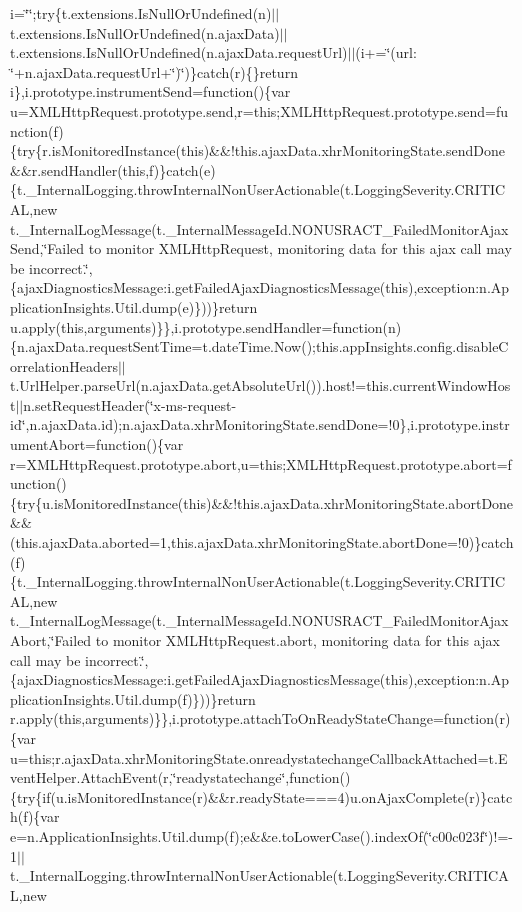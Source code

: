 i=\char`\"{}\char`\"{};try\{t.\+extensions.\+Is\+Null\+Or\+Undefined(n)$\vert$$\vert$t.\+extensions.\+Is\+Null\+Or\+Undefined(n.\+ajax\+Data)$\vert$$\vert$t.\+extensions.\+Is\+Null\+Or\+Undefined(n.\+ajax\+Data.\+request\+Url)$\vert$$\vert$(i+=\char`\"{}(url\+: \textquotesingle{}\char`\"{}+n.\+ajax\+Data.\+request\+Url+\char`\"{}\textquotesingle{})\char`\"{})\}catch(r)\{\}return i\},i.\+prototype.\+instrument\+Send=function()\{var u=\+X\+M\+L\+Http\+Request.\+prototype.\+send,r=this;\+X\+M\+L\+Http\+Request.\+prototype.\+send=function(f)\{try\{r.\+is\+Monitored\+Instance(this)\&\&!this.\+ajax\+Data.\+xhr\+Monitoring\+State.\+send\+Done\&\&r.\+send\+Handler(this,f)\}catch(e)\{t.\+\_\+\+Internal\+Logging.\+throw\+Internal\+Non\+User\+Actionable(t.\+Logging\+Severity.\+C\+R\+I\+T\+I\+C\+A\+L,new t.\+\_\+\+Internal\+Log\+Message(t.\+\_\+\+Internal\+Message\+Id.\+N\+O\+N\+U\+S\+R\+A\+C\+T\+\_\+\+Failed\+Monitor\+Ajax\+Send,\char`\"{}\+Failed to monitor X\+M\+L\+Http\+Request, monitoring data for this ajax call may be incorrect.\char`\"{},\{ajax\+Diagnostics\+Message\+:i.\+get\+Failed\+Ajax\+Diagnostics\+Message(this),exception\+:n.\+Application\+Insights.\+Util.\+dump(e)\}))\}return u.\+apply(this,arguments)\}\},i.\+prototype.\+send\+Handler=function(n)\{n.\+ajax\+Data.\+request\+Sent\+Time=t.\+date\+Time.\+Now();this.\+app\+Insights.\+config.\+disable\+Correlation\+Headers$\vert$$\vert$t.\+Url\+Helper.\+parse\+Url(n.\+ajax\+Data.\+get\+Absolute\+Url()).\+host!=this.\+current\+Window\+Host$\vert$$\vert$n.\+set\+Request\+Header(\char`\"{}x-\/ms-\/request-\/id\char`\"{},n.\+ajax\+Data.\+id);n.\+ajax\+Data.\+xhr\+Monitoring\+State.\+send\+Done=!0\},i.\+prototype.\+instrument\+Abort=function()\{var r=\+X\+M\+L\+Http\+Request.\+prototype.\+abort,u=this;\+X\+M\+L\+Http\+Request.\+prototype.\+abort=function()\{try\{u.\+is\+Monitored\+Instance(this)\&\&!this.\+ajax\+Data.\+xhr\+Monitoring\+State.\+abort\+Done\&\&(this.\+ajax\+Data.\+aborted=1,this.\+ajax\+Data.\+xhr\+Monitoring\+State.\+abort\+Done=!0)\}catch(f)\{t.\+\_\+\+Internal\+Logging.\+throw\+Internal\+Non\+User\+Actionable(t.\+Logging\+Severity.\+C\+R\+I\+T\+I\+C\+A\+L,new t.\+\_\+\+Internal\+Log\+Message(t.\+\_\+\+Internal\+Message\+Id.\+N\+O\+N\+U\+S\+R\+A\+C\+T\+\_\+\+Failed\+Monitor\+Ajax\+Abort,\char`\"{}\+Failed to monitor X\+M\+L\+Http\+Request.\+abort, monitoring data for this ajax call may be incorrect.\char`\"{},\{ajax\+Diagnostics\+Message\+:i.\+get\+Failed\+Ajax\+Diagnostics\+Message(this),exception\+:n.\+Application\+Insights.\+Util.\+dump(f)\}))\}return r.\+apply(this,arguments)\}\},i.\+prototype.\+attach\+To\+On\+Ready\+State\+Change=function(r)\{var u=this;r.\+ajax\+Data.\+xhr\+Monitoring\+State.\+onreadystatechange\+Callback\+Attached=t.\+Event\+Helper.\+Attach\+Event(r,\char`\"{}readystatechange\char`\"{},function()\{try\{if(u.\+is\+Monitored\+Instance(r)\&\&r.\+ready\+State===4)u.\+on\+Ajax\+Complete(r)\}catch(f)\{var e=n.\+Application\+Insights.\+Util.\+dump(f);e\&\&e.\+to\+Lower\+Case().\+index\+Of(\char`\"{}c00c023f\char`\"{})!=-\/1$\vert$$\vert$t.\+\_\+\+Internal\+Logging.\+throw\+Internal\+Non\+User\+Actionable(t.\+Logging\+Severity.\+C\+R\+I\+T\+I\+C\+A\+L,new 